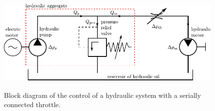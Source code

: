 \begin{figure}[ht!]
	\centering
		\includegraphics[height=5cm]{PositiveDisplacementPumps/Figures/Control_Of_Hydraulic_System_Serial_Throttle.pdf}
	\caption{Block diagram of the control of a hydraulic system with a serially connected throttle.}
	\label{fig:control_of_hydraulic_system_serial_throttle}
\end{figure}

